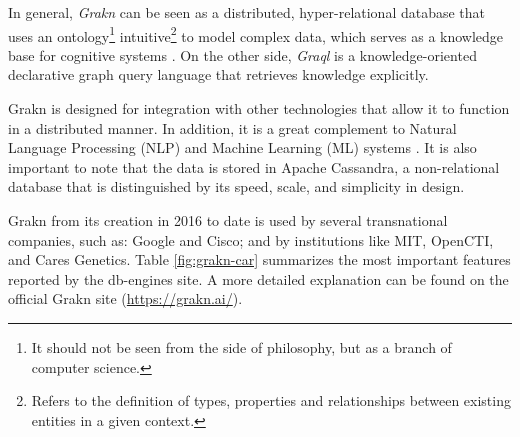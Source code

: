 In general, \textit{Grakn} can be seen as a distributed, hyper-relational database that uses an ontology\footnote{It should not be seen from the side of philosophy, but as a branch of computer science.} intuitive\footnote{Refers to the definition of types, properties and relationships between existing entities in a given context.} to model complex data, which serves as a knowledge base for cognitive systems \cite{dbengines}. On the other side, \textit{Graql} is a knowledge-oriented declarative graph query language that retrieves knowledge explicitly.

Grakn is designed for integration with other technologies that allow it to function in a distributed manner. In addition, it is a great complement to Natural Language Processing (NLP) and Machine Learning (ML) systems \cite{grakn-youtube}. It is also important to note that the data is stored in Apache Cassandra, a non-relational database that is distinguished by its speed, scale, and simplicity in design.

Grakn from its creation in 2016 to date is used by several transnational companies, such as: Google and Cisco; and by institutions like MIT, OpenCTI, and Cares Genetics. Table \ref{fig:grakn-car} summarizes the most important features reported by the db-engines \cite{dbengines} site. A more detailed explanation can be found on the official Grakn site (\url{https://grakn.ai/}).

